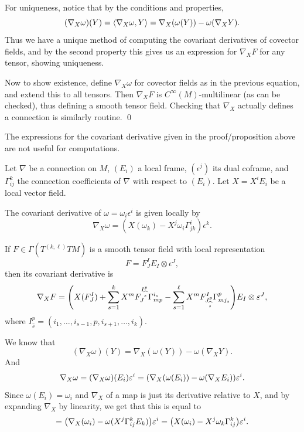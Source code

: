     For uniqueness, notice that by the conditions and properties,
    $$ (\nabla_X\omega)(Y) = \mathopen{}\mathclose{\left<\nabla_X\omega,Y\right>} = \nabla_X(\omega(Y)) - \omega(\nabla_XY) . $$
    Thus we have a unique method of computing the covariant derivatives of covector fields, and by the second property
    this gives us an expression for $\nabla_XF$ for any tensor, showing uniqueness.

    Now to show existence, define $\nabla_X\omega$ for covector fields as in the previous equation, and extend this to
    all tensors.
    Then $\nabla_XF$ is $C^\infty(M)$-multilinear (as can be checked), thus defining a smooth tensor field.
    Checking that $\nabla_X$ actually defines a connection is similarly routine.
    \qed

\eproof

The expressions for the covariant derivative given in the proof/proposition above are not useful for computations.

\bprop

    Let $\nabla$ be a connection on $M$, $(E_i)$ a local frame, $(\epsilon^j)$ its dual coframe, and $\Gamma^k_{ij}$
    the connection coefficients of $\nabla$ with respect to $(E_i)$.
    Let $X=X^iE_i$ be a local vector field.
    \benum
        \item The covariant derivative of $\omega=\omega_i\epsilon^i$ is given locally by
        $$ \nabla_X\omega = (X(\omega_k)-X^j\omega_i\Gamma^i_{jk})\epsilon^k . $$
        \item If $F\in\Gamma(T^{(k,\ell)}TM)$ is a smooth tensor field with local representation
        $$ F = F^I_JE_I\otimes\epsilon^J , $$
        then its covariant derivative is
        $$ \nabla_XF = \mathopen{}\mathclose{\left(X(F^I_J) + \sum_{s=1}^kX^mF^{I^p_{\widehat s}}_J\Gamma^{i_s}_{mp} - \sum_{s=1}^\ell X^mF^I_{J^p_{\widehat s}}\Gamma^p_{mj_s}\right)}
        E_I\otimes\varepsilon^J , $$
        where $I^p_{\hat s}=(i_1,\dots,i_{s-1},p,i_{s+1},\dots,i_k)$.
    \eenum

\eprop

\bproof

    We know that
    $$ (\nabla_X\omega)(Y) = \nabla_X(\omega(Y)) - \omega(\nabla_XY) . $$
    And
    $$ \nabla_X\omega = (\nabla_X\omega)(E_i)\varepsilon^i  = \mathopen{}\mathclose{\left(\nabla_X(\omega(E_i)) - \omega(\nabla_XE_i)\right)}\varepsilon^i . $$
    Since $\omega(E_i)=\omega_i$ and $\nabla_X$ of a map is just its derivative relative to $X$, and by expanding $\nabla_X$ by linearity,
    we get that this is equal to
    $$ = \mathopen{}\mathclose{\left(\nabla_X(\omega_i) - \omega(X^j\Gamma^k_{ij}E_k)\right)}\varepsilon^i = \mathopen{}\mathclose{\left(X(\omega_i) - X^j\omega_k\Gamma^k_{ij}\right)}\varepsilon^i . $$

